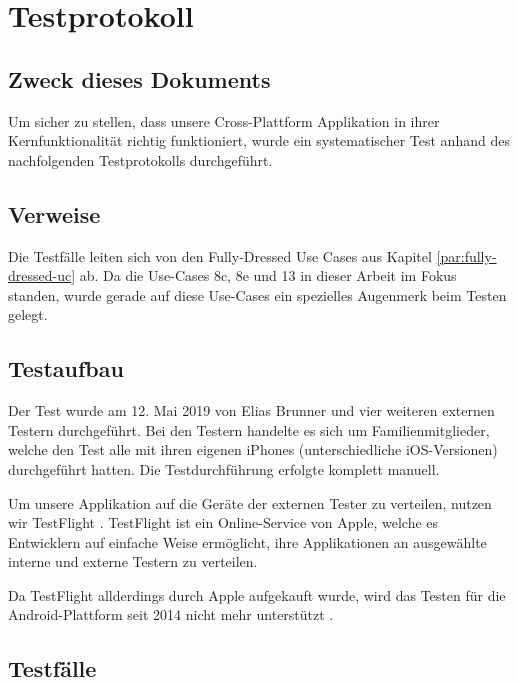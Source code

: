 \section{Testprotokoll}
\subsection{Zweck dieses Dokuments}
Um sicher zu stellen, dass unsere Cross-Plattform Applikation in ihrer Kernfunktionalität richtig funktioniert, wurde ein systematischer Test anhand des nachfolgenden Testprotokolls durchgeführt.

\subsection{Verweise}
Die Testfälle leiten sich von den Fully-Dressed Use Cases aus Kapitel \ref{par:fully-dressed-uc} ab. Da die Use-Cases 8c, 8e und 13 in dieser Arbeit im Fokus standen, wurde gerade auf diese Use-Cases ein spezielles Augenmerk beim Testen gelegt.

\subsection{Testaufbau}
Der Test wurde am 12. Mai 2019 von Elias Brunner und vier weiteren externen Testern durchgeführt. Bei den Testern handelte es sich um Familienmitglieder, welche den Test alle mit ihren eigenen iPhones (unterschiedliche iOS-Versionen) durchgeführt hatten. Die Testdurchführung erfolgte komplett manuell.

Um unsere Applikation auf die Geräte der externen Tester zu verteilen, nutzen wir TestFlight \cite{testflight}. TestFlight ist ein Online-Service von Apple, welche es Entwicklern auf einfache Weise ermöglicht, ihre Applikationen an ausgewählte interne und externe Testern zu verteilen. 

Da TestFlight allderdings durch Apple aufgekauft wurde, wird das Testen für die Android-Plattform seit 2014 nicht mehr unterstützt \cite{testflightWikipedia}. 

\subsection{Testfälle}


